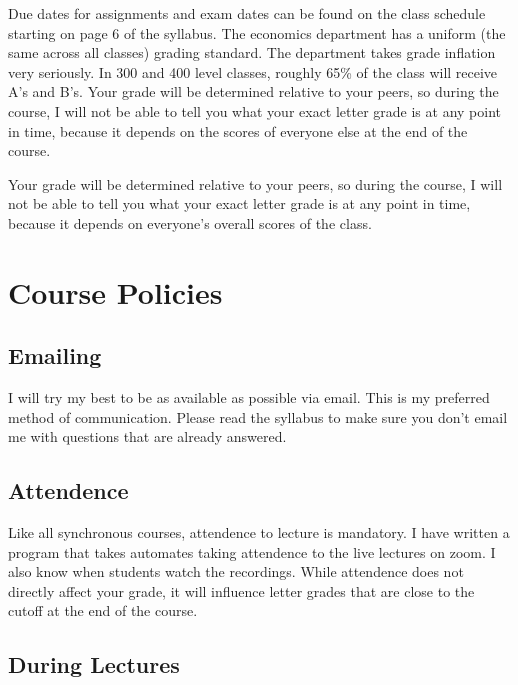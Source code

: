 \documentclass[11pt]{article}
\begin{document}
Due dates for assignments and exam dates can be found on the class schedule starting on page 6 of the syllabus. The economics department has a uniform (the same across all classes) grading standard.  The department takes grade inflation very seriously. In 300 and 400 level classes, roughly 65\% of the class will receive A's and B's. Your grade will be determined relative to your peers, so during the course, I will not be able to tell you what your exact letter grade is at any point in time, because it depends on the scores of everyone else at the end of the course.

Your grade will be determined relative to your peers, so during the course, I will not be able to tell you what your exact letter grade is at any point in time, because it depends on everyone’s overall scores of the class.

	
	
	
	\section*{Course Policies}
	
	\subsection*{Emailing}
	
	I will try my best to be as available as possible via email. This is my preferred method of communication. Please read the syllabus to make sure you don't email me with questions that are already answered.
	
	\subsection*{Attendence}
	
	Like all synchronous courses, attendence to lecture is mandatory. I have written a program that takes automates taking attendence to the live lectures on zoom. I also know when students watch the recordings. While attendence does not directly affect your grade, it will influence letter grades that are close to the cutoff at the end of the course.
	
	\subsection*{During Lectures}
	
\end{document}
